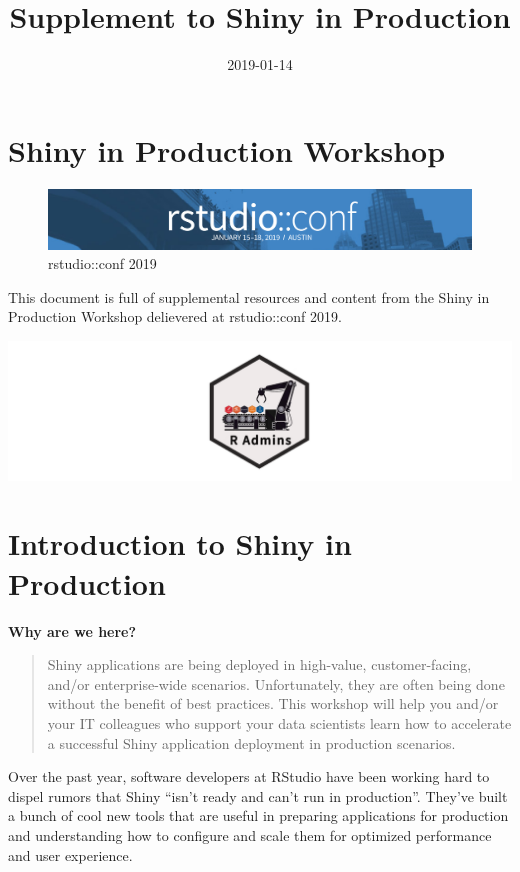 \documentclass[]{book}
\title{Supplement to Shiny in Production}
\author{}
\date{2019-01-14}
\theoremstyle{definition}
\theoremstyle{definition}
\theoremstyle{definition}
\theoremstyle{remark}
\begin{document}
\maketitle

{
\setcounter{tocdepth}{1}
\tableofcontents
}
\hypertarget{shiny-in-production-workshop}{%
\chapter{Shiny in Production
Workshop}\label{shiny-in-production-workshop}}

\begin{figure}
\centering
\includegraphics{imgs/conf-banner.png}
\caption{rstudio::conf 2019}
\end{figure}

This document is full of supplemental resources and content from the
Shiny in Production Workshop delievered at rstudio::conf 2019.

\includegraphics{imgs/radmins-banner.png}

\hypertarget{course-intro}{%
\chapter{Introduction to Shiny in Production}\label{course-intro}}

\textbf{Why are we here?}

\begin{quote}
Shiny applications are being deployed in high-value, customer-facing,
and/or enterprise-wide scenarios. Unfortunately, they are often being
done without the benefit of best practices. This workshop will help you
and/or your IT colleagues who support your data scientists learn how to
accelerate a successful Shiny application deployment in production
scenarios.
\end{quote}

Over the past year, software developers at RStudio have been working
hard to dispel rumors that Shiny ``isn't ready and can't run in
production''. They've built a bunch of cool new tools that are useful in
preparing applications for production and understanding how to configure
and scale them for optimized performance and user experience.
\end{document}
